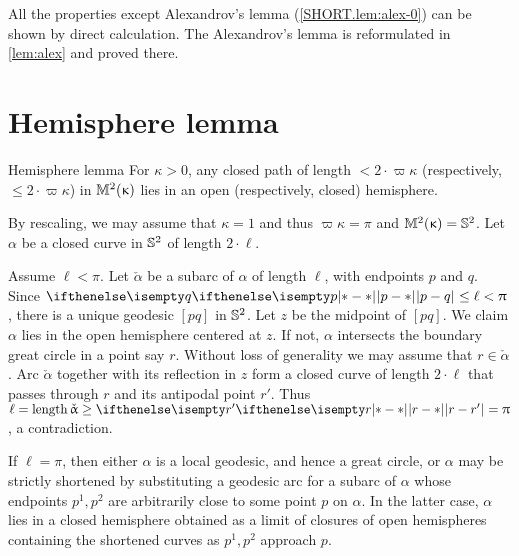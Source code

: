 All the properties except Alexandrov's lemma (\ref{SHORT.lem:alex-0}) can be shown by direct calculation.
The Alexandrov's lemma is reformulated in \ref{lem:alex} and proved there.
\qeds



\section{Hemisphere lemma}\label{curves-in-model}





\begin{thm}{Hemisphere lemma}
\label{lem:hemisphere}
For $\kappa>0$, any closed path of length $<2\cdot \varpi\kappa$ (respectively, $\le2\cdot \varpi\kappa$) in $\mathbb{M}_{{}}^{2}({\upkappa})$ lies in an open (respectively, closed) hemisphere. 
\end{thm}

 By rescaling, we may assume that $\kappa=1$ and thus $\varpi\kappa=\pi$ and $\mathbb{M}_{{}}^{2}({\upkappa})=\mathbb{S}^2$.
Let $\alpha$ be a closed curve in $\mathbb{S}^2$ of length $2\cdot\ell$.

Assume $\ell<\pi$.
Let $\check\alpha$ be a subarc of $\alpha$ of length $\ell$, with endpoints $p$ and $q$. 
Since $\dist{p}{q}{}\le\ell<\pi$, there is a unique geodesic $[pq]$ in $\mathbb{S}^2$.  
Let $z$ be the midpoint of  $[pq]$.  
We claim $\alpha$ lies in the open hemisphere centered at $z$.  
If not, $\alpha$ intersects the boundary  great circle in a point say $r$.
Without loss of generality we may assume that $r\in\check\alpha$. 
Arc $\check\alpha$ together with its reflection in $z$ form a closed curve of length $2\cdot \ell$ that passes through $r$ and its antipodal point $r'$.
Thus $\ell=\length \check\alpha\ge \dist{r}{r'}{}=\pi$, a contradiction.

If $\ell=\pi$, then either $\alpha$ is a local geodesic, and hence a great circle, 
or $\alpha$ may be strictly shortened by substituting a geodesic arc for a subarc of $\alpha$ 
whose endpoints $p^1,p^2$ are arbitrarily close to some point $p$ on  $\alpha$.
In the latter case,  $\alpha$ lies in a closed hemisphere obtained as a limit of closures of open hemispheres  containing the shortened curves as $p^1,p^2$ approach $p$.
\qeds




